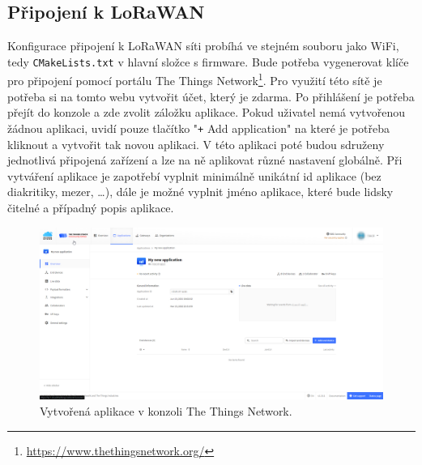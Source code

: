 \subsection{Připojení k LoRaWAN}

Konfigurace připojení k LoRaWAN síti probíhá ve stejném souboru jako WiFi, tedy \texttt{CMakeLists.txt} v hlavní složce s firmware. Bude potřeba vygenerovat klíče pro připojení pomocí portálu The Things Network\footnote{\url{https://www.thethingsnetwork.org/}}. Pro využití této sítě je potřeba si na tomto webu vytvořit účet, který je zdarma. Po přihlášení je potřeba přejít do konzole a zde zvolit záložku aplikace. Pokud uživatel nemá vytvořenou žádnou aplikaci, uvidí pouze tlačítko "\texttt{+} Add application"{} na které je potřeba kliknout a vytvořit tak novou aplikaci. V této aplikaci poté budou sdruženy jednotlivá připojená zařízení a lze na ně aplikovat různé nastavení globálně. Při vytváření aplikace je zapotřebí vyplnit minimálně unikátní id aplikace (bez diakritiky, mezer, \dots), dále je možné vyplnit jméno aplikace, které bude lidsky čitelné a případný popis aplikace.

\begin{figure}[h]
    \centering
    \includegraphics[width=\textwidth]{obrazky/ttnApps.png}
    \caption{Vytvořená aplikace v konzoli The Things Network.}
    \label{fig_TTNApp}
\end{figure}

